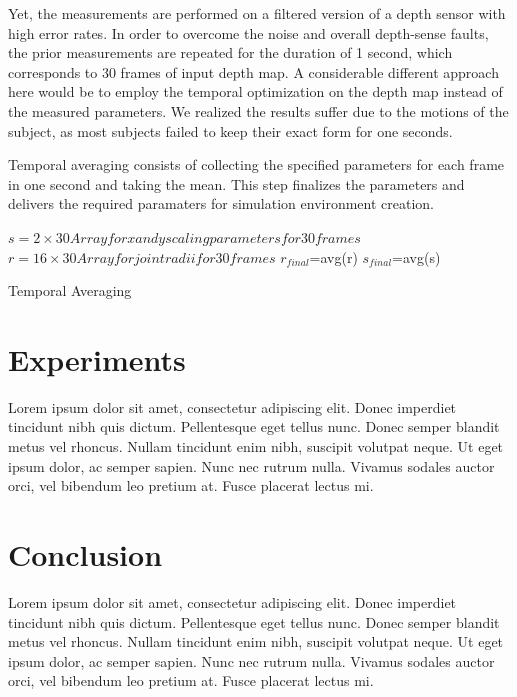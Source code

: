 \documentclass[twocolumn]{svjour3}          %
\begin{document}
Yet, the measurements are performed on a filtered version of a depth sensor with high error rates. In order to overcome the noise and overall depth-sense faults,
the prior measurements are repeated for the duration of 1 second, which corresponds to 30 frames of input depth map. 
A considerable different approach here would be to employ the temporal optimization on the depth map instead of the measured parameters. We realized the results suffer due to the motions of the subject, as most subjects failed to keep their exact form for one seconds.

Temporal averaging consists of collecting the specified parameters for each frame in one second and taking the mean. This step finalizes the parameters and delivers the required paramaters for simulation environment creation. 
\begin{algorithm}
\dontprintsemicolon %
$s=2 \times 30 Array for x and y scaling parameters for 30 frames$ \;
$r=16 \times 30 Array for joint radii for 30 frames$\;
$r_{final}$=avg(r)\;
$s_{final}$=avg(s)\;
\caption{Temporal Averaging}
\label{algo:temporal_averaging}
\end{algorithm}


\section{Experiments}
\label{sec:4}
Lorem ipsum dolor sit amet, consectetur adipiscing elit. Donec imperdiet tincidunt nibh quis dictum. Pellentesque eget tellus nunc. Donec semper blandit metus vel rhoncus. Nullam tincidunt enim nibh, suscipit volutpat neque. Ut eget ipsum dolor, ac semper sapien. Nunc nec rutrum nulla. Vivamus sodales auctor orci, vel bibendum leo pretium at. Fusce placerat lectus mi.


\section{Conclusion}
\label{sec:5}
Lorem ipsum dolor sit amet, consectetur adipiscing elit. Donec imperdiet tincidunt nibh quis dictum. Pellentesque eget tellus nunc. Donec semper blandit metus vel rhoncus. Nullam tincidunt enim nibh, suscipit volutpat neque. Ut eget ipsum dolor, ac semper sapien. Nunc nec rutrum nulla. Vivamus sodales auctor orci, vel bibendum leo pretium at. Fusce placerat lectus mi.
\end{document}
